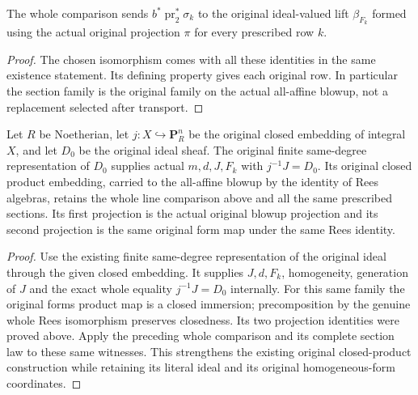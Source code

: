 \begin{proposition}
\label{prop:whole-original-native-product-line-sections}
\leanok
{}
The whole comparison sends $b^*\operatorname{pr}_2^*\sigma_k$ to the original
ideal-valued lift $\beta_{F_k}$ formed using the actual original projection
$\pi$ for every prescribed row $k$.
\end{proposition}
\begin{proof}
The chosen isomorphism comes with all these identities in the same existence
statement. Its defining property gives each original row. In particular the
section family is the original family on the actual all-affine blowup, not a
replacement selected after transport.
\end{proof}

\begin{proposition}
\label{prop:whole-original-native-product-witness-line-sections}
\leanok
{}
Let $R$ be Noetherian, let $j:X\hookrightarrow\mathbf P^n_R$ be the original
closed embedding of integral $X$, and let $D_0$ be the original ideal sheaf.
The original finite same-degree representation of $D_0$ supplies actual
$m,d,J,F_k$ with $j^{-1}J=D_0$. Its original closed product embedding, carried
to the all-affine blowup by the identity of Rees algebras, retains the whole
line comparison above and all the same prescribed sections. Its first
projection is the actual original blowup projection and its second projection
is the same original form map under the same Rees identity.
\end{proposition}
\begin{proof}
Use the existing finite same-degree representation of the original ideal
through the given closed embedding. It supplies $J,d,F_k$, homogeneity,
generation of $J$ and the exact whole equality $j^{-1}J=D_0$ internally.
For this same family the original forms product map is a closed immersion;
precomposition by the genuine whole Rees isomorphism preserves closedness.
Its two projection identities were proved above. Apply the preceding whole
comparison and its complete section law to these same witnesses. This
strengthens the existing original closed-product construction while retaining
its literal ideal and its original homogeneous-form coordinates.
\end{proof}
